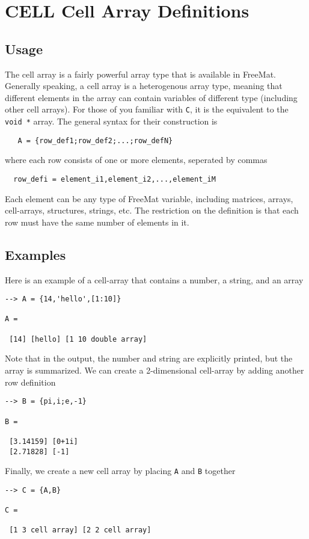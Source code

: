 \section{CELL Cell Array Definitions}

\subsection{Usage}

The cell array is a fairly powerful array type that is available
in FreeMat.  Generally speaking, a cell array is a heterogenous
array type, meaning that different elements in the array can 
contain variables of different type (including other cell arrays).
For those of you familiar with \verb|C|, it is the equivalent to the
\verb|void *| array.  The general syntax for their construction is
\begin{verbatim}
   A = {row_def1;row_def2;...;row_defN}
\end{verbatim}
where each row consists of one or more elements, seperated by
commas
\begin{verbatim}
  row_defi = element_i1,element_i2,...,element_iM
\end{verbatim}
Each element can be any type of FreeMat variable, including
matrices, arrays, cell-arrays, structures, strings, etc.  The
restriction on the definition is that each row must have the
same number of elements in it.
\subsection{Examples}

Here is an example of a cell-array that contains a number,
a string, and an array
\begin{verbatim}
--> A = {14,'hello',[1:10]}

A = 

 [14] [hello] [1 10 double array] 
\end{verbatim}
Note that in the output, the number and string are explicitly
printed, but the array is summarized.
We can create a 2-dimensional cell-array by adding another
row definition
\begin{verbatim}
--> B = {pi,i;e,-1}

B = 

 [3.14159] [0+1i] 
 [2.71828] [-1] 
\end{verbatim}
Finally, we create a new cell array by placing \verb|A| and \verb|B|
together
\begin{verbatim}
--> C = {A,B}

C = 

 [1 3 cell array] [2 2 cell array] 
\end{verbatim}
